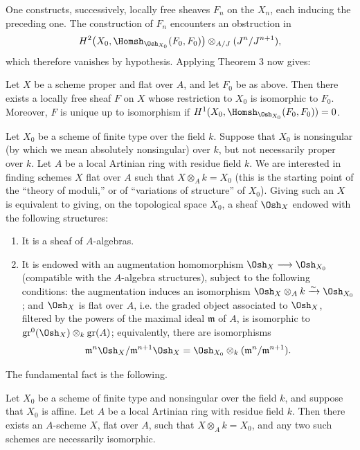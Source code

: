 One constructs, successively, locally free sheaves $F_n$ on the $X_n$, each
inducing the preceding one. The construction of $F_n$ encounters an
obstruction in
\[
  H^2\bigl(X_0,\Homsh_{\Osh_{X_0}}(F_0,F_0)\bigr)
  \otimes_{A/J}(J^n/J^{n+1}),
\]
which therefore vanishes by hypothesis. Applying Theorem 3 now gives:

 Let $X$ be a scheme proper and flat over $A$, and let
$F_0$ be as above. Then there exists a locally free sheaf $F$ on $X$ whose
restriction to $X_0$ is isomorphic to $F_0$. Moreover, $F$ is unique up to
isomorphism if $H^1(X_0,\Homsh_{\Osh_{X_0}}(F_0,F_0))=0$.

Let $X_0$ be a scheme of finite type over the field $k$. Suppose that $X_0$ is
nonsingular (by which we mean absolutely nonsingular) over $k$, but not
necessarily proper over $k$. Let $A$ be a local Artinian ring with residue
field $k$. We are interested in finding schemes $X$ flat over $A$ such that
$X\otimes_A k=X_0$ (this is the starting point of the “theory of moduli,” or
of “variations of structure” of $X_0$). Giving such an $X$ is equivalent to
giving, on the topological space $X_0$, a sheaf $\Osh_X$ endowed with the
following structures:
\begin{enumerate}
  \item[\textit{i.}] It is a sheaf of $A$-algebras.
  \item[\textit{ii.}] It is endowed with an augmentation homomorphism
    $\Osh_X\longrightarrow\Osh_{X_0}$ (compatible with the $A$-algebra
    structures), subject to the following conditions: the augmentation
    induces an isomorphism
    $\Osh_X\otimes_A k\xrightarrow{\sim}\Osh_{X_0}$; and $\Osh_X$ is flat
    over $A$, i.e. the graded object associated to $\Osh_X$, filtered by the
    powers of the maximal ideal $\mathfrak m$ of $A$, is isomorphic to
    $\operatorname{gr}^0(\Osh_X)\otimes_k\operatorname{gr}(A)$; equivalently,
    there are isomorphisms
    \[
      \mathfrak m^n\Osh_X/\mathfrak m^{n+1}\Osh_X
      =\Osh_{X_0}\otimes_k(\mathfrak m^n/\mathfrak m^{n+1}).
    \]
\end{enumerate}
The fundamental fact is the following.

 Let $X_0$ be a scheme of finite type and nonsingular over
the field $k$, and suppose that $X_0$ is affine. Let $A$ be a local Artinian
ring with residue field $k$. Then there exists an $A$-scheme $X$, flat over
$A$, such that $X\otimes_A k=X_0$, and any two such schemes are necessarily
isomorphic.

